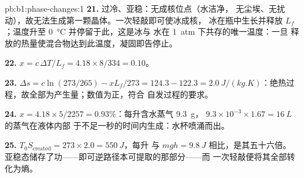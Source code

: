\begin{solution}{pb:b1:phase-changes:1}
\textbf{21.} 过冷、亚稳：无成核位点（水洁净，
无尘埃、无扰动），故无法生成第一颗晶体。一次轻敲即可使冰成核，
冰在瓶中生长并释放 $L_f$；温度升至
\qty{0}{\degreeCelsius} 并停留于此，这是冰与
水在 \qty{1}{atm} 下共存的唯一温度：一旦
释放的热量使混合物达到此温度，凝固即告停止。

\textbf{22.} $x = c\,\Delta T/L_f = 4.18 \times 8/334 = 0.10$。

\textbf{23.} $\Delta s = c\ln(273/265) - xL_f/273 = 124.3 - 122.3 =
\qty{+2.0}{J/(kg.K)}$：绝热过程，故全部为产生量；数值为正，符合
自发过程的要求。

\textbf{24.} $x = 4.18 \times 5/2257 = 0.93\%$：每升含水蒸气 \qty{9.3}{g}，
$9.3 \times 10^{-3} \times 1.67 = \qty{16}{L}$ 的蒸气在液体内部
于不足一秒的时间内生成：水杯喷涌而出。

\textbf{25.} $T_0S_{\mathrm{created}} = 273 \times 2.0 = \qty{550}{J}$，每升
与 $mgh = \qty{9.8}{J}$ 相比，是其五十六倍。
亚稳态储存了功——即可逆路径本可提取的那部分——而
一次轻敲便将其全部转化为熵。
\end{solution}
